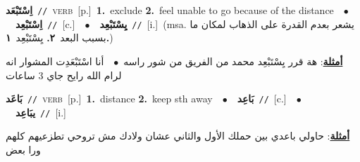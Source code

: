\documentclass[10pt,a4paper,twoside]{article} %
\begin{document}
\begin{multicols}{2}
{\setlength\topsep{0pt}\textbf{\foreignlanguage{arabic}{اِسْتَبْعَد}}\ {\color{gray}\texttt{//}\color{black}}\ \textsc{verb}\ [p.]\ \textbf{1.}~exclude  \textbf{2.}~feel unable to go because of the distance\ \ $\bullet$\ \ \setlength\topsep{0pt}\textbf{\foreignlanguage{arabic}{اِسْتَبْعِد}}\ {\color{gray}\texttt{//}\color{black}}\ [c.]\ \ $\bullet$\ \ \setlength\topsep{0pt}\textbf{\foreignlanguage{arabic}{يِسْتَبْعِد}}\ {\color{gray}\texttt{//}\color{black}}\ [i.]\ \color{gray}(msa. \foreignlanguage{arabic}{يشعر بعدم القدرة على الذهاب لمكان ما بسبب البعد}~\foreignlanguage{arabic}{\textbf{٢.}}  \foreignlanguage{arabic}{يِسْتَبْعِد}~\foreignlanguage{arabic}{\textbf{١.}})\color{black}\  \begin{flushright}\color{gray}\foreignlanguage{arabic}{\textbf{\underline{\foreignlanguage{arabic}{أمثلة}}}: هة قرر يِسْتَبْعِد محمد من الفريق من شور راسه\ $\bullet$\ \  أنا اسْتَبْعَدِت المشوار انه لرام الله رايح جاي 3 ساعات}\end{flushright}\color{black}} \vspace{2mm}

{\setlength\topsep{0pt}\textbf{\foreignlanguage{arabic}{بَاعَد}}\ {\color{gray}\texttt{//}\color{black}}\ \textsc{verb}\ [p.]\ \textbf{1.}~distance  \textbf{2.}~keep sth away\ \ $\bullet$\ \ \setlength\topsep{0pt}\textbf{\foreignlanguage{arabic}{بَاعِد}}\ {\color{gray}\texttt{//}\color{black}}\ [c.]\ \ $\bullet$\ \ \setlength\topsep{0pt}\textbf{\foreignlanguage{arabic}{يبَاعِد}}\ {\color{gray}\texttt{//}\color{black}}\ [i.]\  \begin{flushright}\color{gray}\foreignlanguage{arabic}{\textbf{\underline{\foreignlanguage{arabic}{أمثلة}}}: حاولي باعدي بين حملك الأول والثاني عشان ولادك مش تروحي تطزعيهم كلهم ورا بعض}\end{flushright}\color{black}} \vspace{2mm}


\end{multicols}
\end{document}
